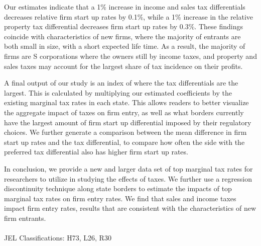\documentclass[12 pt,a4paper]{article} %
\begin{document}
Our estimates indicate that a 1\% increase in income and sales tax differentials decreases relative firm start up rates by 0.1\%, while a 1\% increase in the relative property tax differential decreases firm start up rates by 0.3\%. These findings coincide with characteristics of new firms, where the majority of entrants are both small in size, with a short expected life time. As a result, the majority of firms are S corporations where the owners still by income taxes, and property and sales taxes may account for the largest share of tax incidence on their profits.

A final output of our study is an index of where the tax differentials are the largest. This is calculated by multiplying our estimated coefficients by the existing marginal tax rates in each state. This allows readers to better visualize the aggregate impact of taxes on firm entry, as well as what borders currently have the largest amount of firm start up differential imposed by their regulatory choices. We further generate a comparison between the mean difference in firm start up rates and the tax differential, to compare how often the side with the preferred tax differential also has higher firm start up rates.

In conclusion, we provide a new and larger data set of top marginal tax rates for researchers to utilize in studying the effects of taxes. We further use a regression discontinuity technique along state borders to estimate the impacts of top marginal tax rates on firm entry rates. We find that sales and income taxes impact firm entry rates, results that are consistent with the characteristics of new firm entrants.
\\
\\
JEL Classifications: H73, L26, R30
\end{document}
